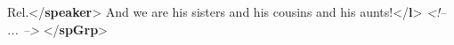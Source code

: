 \begin{shaded}
\mbox{}\newline 
{}\mbox{}\newline 
\hspace*{1em}Rel.{</\textbf{speaker}>}\mbox{}\newline 
\hspace*{1em}And we are his sisters and his cousins and his aunts!{</\textbf{l}>}\mbox{}\newline 
{}\mbox{}\newline 
\textit{<!-- ... -->}\mbox{}\newline 
{</\textbf{spGrp}>}\end{shaded}\egroup\par \par
